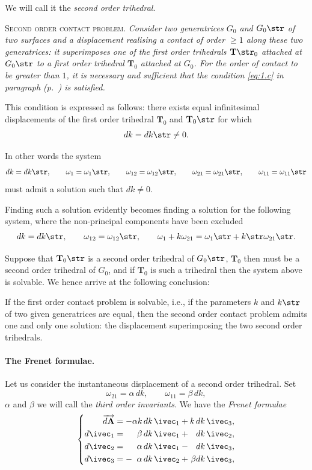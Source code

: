 We will call it the \emph{second order trihedral}.

\somespace

\textsc{Second order contact problem.} \emph{Consider two generatrices $G_{0}$ and $G_{0}\str$ of two surfaces and a displacement realising a contact of order $\ge 1$ along these two generatrices: it superimposes one of the first order trihedrals $\mathbf{T}\str_{0}$ attached at $G_{0}\str$ to a first order trihedral $\mathbf{T}_{0}$ attached at $G_{0}$. For the order of contact to be greater than $1$, it is necessary and sufficient that the condition \eqref{eq:1.c} in paragraph \emph{ (p.~\pageref{eq:1.c})} is satisfied.}

\somespace

This condition is expressed as follows: there exists equal infinitesimal displacements of the first order trihedral $\mathbf{T}_{0}$ and $\mathbf{T}_{0}\str$ for which
\[
dk=dk\str\neq 0.
\]

In other words the system
\[
dk=dk\str,\qquad\omega_{1}=\omega_{1}\str,\qquad\omega_{12}=\omega_{12}\str,\qquad\omega_{21}=\omega_{21}\str,\qquad\omega_{11}=\omega_{11}\str
\]
must admit a solution such that $dk\neq 0$.

Finding such a solution evidently becomes finding a solution for the following system, where the non-principal components have been excluded
\[
dk=dk\str,\qquad\omega_{12}=\omega_{12}\str,\qquad\omega_{1}+k\omega_{21}=\omega_{1}\str+k\str\omega_{21}\str.
\]

Suppose that $\mathbf{T}_{0}\str$ is a second order trihedral of $G_{0}\str$, $\mathbf{T}_{0}$ then must be a second order trihedral of $G_{0}$, and if $\mathbf{T}_{0}$ is such a trihedral then the system above is solvable. We hence arrive at the following conclusion:

If the first order contact problem is solvable, i.e., if the parameters $k$ and $k\str$ of two given generatrices are equal, then the second order contact problem admits one and only one solution: the displacement superimposing the two second order trihedrals.

\paragraph{The Frenet formulae.}
\label{sec:57}
Let us consider the instantaneous displacement of a second order trihedral. Set
\[
\omega_{21}=\alpha\,dk,\qquad\omega_{11}=\beta\,dk,
\]
$\alpha$ and $\beta$ we will call the \emph{third order invariants}. We have the \emph{Frenet formulae}
\begin{equation}
  \label{eq:4.13}
  \left\{
    \begin{alignedat}{6}
      \overrightarrow{d\mathbf{A}}&={}&-{}&&\alpha k\,dk\,\ivec_{1}&+{}&k\,dk\,\ivec_{3},\\
      d\ivec_{1}&=&&&\beta\,dk\,\ivec_{1}&{}+{}&dk\,\ivec_{2},\\
      d\ivec_{2}&=&&&\alpha\,dk\,\ivec_{1}&{}-{}&dk\,\ivec_{3},\\
      d\ivec_{3}&=&-&&\alpha\,dk\,\ivec_{2}&{}+{}&\beta dk\,\ivec_{3},      
    \end{alignedat}
  \right.
\end{equation}

